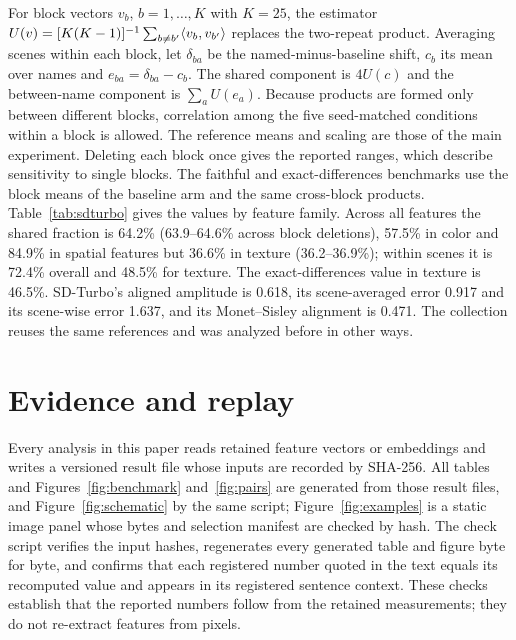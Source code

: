 For block vectors $v_b$, $b=1,\dots,K$ with $K=25$, the estimator
$U(v)=[K(K-1)]^{-1}\sum_{b\ne b'}\langle v_b,v_{b'}\rangle$ replaces the two-repeat product. Averaging
scenes within each block, let $\delta_{ba}$ be the named-minus-baseline shift, $c_b$ its mean
over names and $e_{ba}=\delta_{ba}-c_b$. The shared component is $4U(c)$ and the between-name
component is $\sum_aU(e_a)$. Because products are formed only between different blocks,
correlation among the five seed-matched conditions within a block is allowed. The reference
means and scaling are those of the main experiment. Deleting each block once gives the reported
ranges, which describe sensitivity to single blocks. The faithful and exact-differences benchmarks use
the block means of the baseline arm and the same cross-block products. Table~\ref{tab:sdturbo}
gives the values by feature family. Across all features the shared fraction is 64.2\%
(63.9--64.6\% across block deletions), 57.5\% in color and 84.9\% in spatial features but 36.6\%
in texture (36.2--36.9\%); within scenes it is 72.4\% overall and 48.5\% for texture. The
exact-differences value in texture is 46.5\%. SD-Turbo's aligned amplitude is 0.618, its
scene-averaged error 0.917 and its scene-wise error 1.637, and its Monet--Sisley alignment is
0.471. The collection reuses the same references and was analyzed before in other ways.



\FloatBarrier
\section{Evidence and replay}\label{app:replay}

Every analysis in this paper reads retained feature vectors or embeddings and writes a versioned
result file whose inputs are recorded by SHA-256. All tables and Figures~\ref{fig:benchmark}
and~\ref{fig:pairs} are generated from those result files, and Figure~\ref{fig:schematic} by the
same script; Figure~\ref{fig:examples} is a static image panel whose bytes and selection manifest are
checked by hash. The check script verifies the input hashes, regenerates every generated table and
figure byte for byte, and confirms that each registered number quoted in the text equals its
recomputed value and appears in its registered sentence context. These checks establish that the
reported numbers follow from the retained measurements; they do not re-extract features from
pixels.
